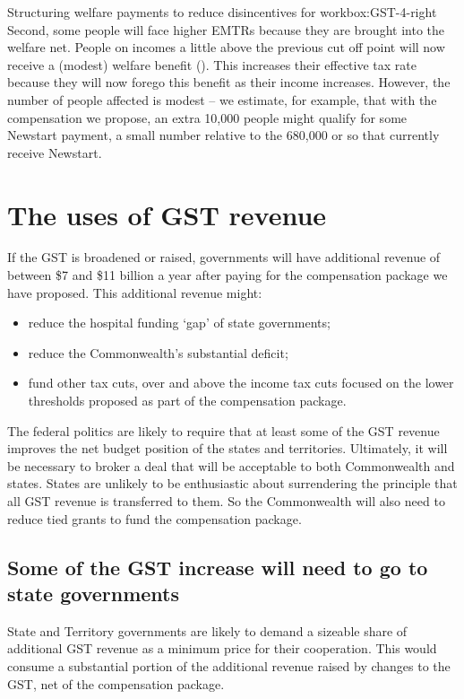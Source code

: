 {\begin{rultrabox}{Structuring welfare payments to reduce disincentives for work}{box:GST-4-right}
Second, some people will face higher EMTRs because they are brought into the welfare net. People on incomes a little above the previous cut off point will now receive a (modest) welfare benefit (). This increases their effective tax rate because they will now forego this benefit as their income increases. However, the number of people affected is modest – we estimate, for example, that with the compensation we propose, an extra 10,000 people might qualify for some Newstart payment, a small number relative to the 680,000 or so that currently receive Newstart. 
\end{rultrabox}}


\chapter{The uses of GST revenue}\label{chapter:GST-4}
If the GST is broadened or raised, governments will have additional revenue of between \$7 and \$11 billion a year after paying for the compensation package we have proposed. This additional revenue might:
\begin{itemize}
\item	reduce the hospital funding ‘gap’ of state governments;
\item 	reduce the Commonwealth’s substantial deficit; 
\item 	fund other tax cuts, over and above the income tax cuts focused on the lower thresholds proposed as part of the compensation package. 
\end{itemize}
The federal politics are likely to require that at least some of the GST revenue improves the net budget position of the states and territories. Ultimately, it will be necessary to broker a deal that will be acceptable to both Commonwealth and states. States are unlikely to be enthusiastic about surrendering the principle that all GST revenue is transferred to them. So the Commonwealth will also need to reduce tied grants to fund the compensation package. 

\section{Some of the GST increase will need to go to state governments}\label{sec:4-1}
State and Territory governments are likely to demand a sizeable share of additional GST revenue as a minimum price for their cooperation. This would consume a substantial portion of the additional revenue raised by changes to the GST, net of the compensation package.

